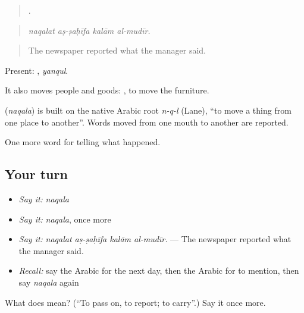 \begin{quote}
   .
\end{quote}

\begin{quote}
\emph{naqalat aṣ-ṣaḥīfa kalām al-mudīr.}
\end{quote}

\begin{quote}
The newspaper reported what the manager said.
\end{quote}

Present: , \emph{yanqul}.

It also moves people and goods:  , to move the furniture.

\begin{cousinweb}
\textbf{} (\emph{naqala}) is built on the native Arabic root \emph{n-q-l} (Lane), \textquotedblleft{}to move a thing from one place to another\textquotedblright{}. Words moved from one mouth to another are reported.
\end{cousinweb}

\begin{grammarlens}[title={What you've built}]
One more word for telling what happened.
\end{grammarlens}

\subsection*{Your turn}
\begin{itemize}
\raggedright
  \item \emph{Say it:} \emph{naqala}
  \item \emph{Say it:} \emph{naqala}, once more
  \item \emph{Say it:} \emph{naqalat aṣ-ṣaḥīfa kalām al-mudīr.} — The newspaper reported what the manager said.
  \item \emph{Recall:} say the Arabic for the next day, then the Arabic for to mention, then say \emph{naqala} again
\end{itemize}

\begin{tcolorbox}[breakable,colback=teal!4,colframe=teal!35!black,title={Before you move on}]
What does  mean? (\textquotedblleft{}To pass on, to report; to carry\textquotedblright{}.) Say it once more.
\end{tcolorbox}
